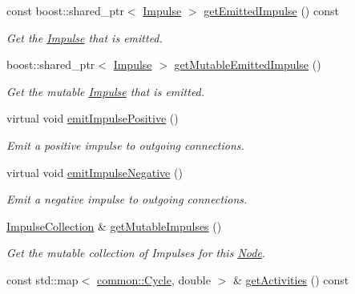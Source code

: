 \begin{DoxyCompactItemize}
const boost\-::shared\-\_\-ptr$<$ \hyperlink{classcryomesh_1_1components_1_1Impulse}{\-Impulse} $>$ \hyperlink{classcryomesh_1_1components_1_1Node_a8a90b1faf2e6b633bbb4853e522c29b7}{get\-Emitted\-Impulse} () const 
\begin{DoxyCompactList}\small\item\em \-Get the \hyperlink{classcryomesh_1_1components_1_1Impulse}{\-Impulse} that is emitted. \end{DoxyCompactList}\item 
boost\-::shared\-\_\-ptr$<$ \hyperlink{classcryomesh_1_1components_1_1Impulse}{\-Impulse} $>$ \hyperlink{classcryomesh_1_1components_1_1Node_aa6e0c0a0063e657053482aac777759d3}{get\-Mutable\-Emitted\-Impulse} ()
\begin{DoxyCompactList}\small\item\em \-Get the mutable \hyperlink{classcryomesh_1_1components_1_1Impulse}{\-Impulse} that is emitted. \end{DoxyCompactList}\item 
virtual void \hyperlink{classcryomesh_1_1components_1_1Node_a8fc7efcfff86d2ca72b54166f600b7d0}{emit\-Impulse\-Positive} ()
\begin{DoxyCompactList}\small\item\em \-Emit a positive impulse to outgoing connections. \end{DoxyCompactList}\item 
virtual void \hyperlink{classcryomesh_1_1components_1_1Node_a75addf25b1b16bf1476cf19f00d7513d}{emit\-Impulse\-Negative} ()
\begin{DoxyCompactList}\small\item\em \-Emit a negative impulse to outgoing connections. \end{DoxyCompactList}\item 
\hyperlink{classcryomesh_1_1components_1_1ImpulseCollection}{\-Impulse\-Collection} \& \hyperlink{classcryomesh_1_1components_1_1Node_adaa0b9f4c9a6130525fce2e43f418bc3}{get\-Mutable\-Impulses} ()
\begin{DoxyCompactList}\small\item\em \-Get the mutable collection of \-Impulses for this \hyperlink{classcryomesh_1_1components_1_1Node}{\-Node}. \end{DoxyCompactList}\item 
const std\-::map$<$ \hyperlink{classcryomesh_1_1common_1_1Cycle}{common\-::\-Cycle}, \*
double $>$ \& \hyperlink{classcryomesh_1_1components_1_1Node_a98801c702bf6613f06880f7cc577ddd7}{get\-Activities} () const 

\end{DoxyCompactItemize}
